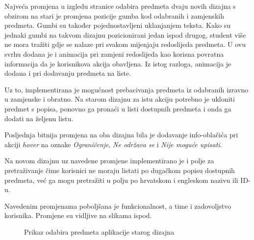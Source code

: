 \documentclass[times, utf8, zavrsni, numeric]{fer}
\begin{document}
    
    Najveća promjena u izgledu stranice odabira predmeta dvaju novih dizajna s obzirom na stari je promjena pozicije gumba kod odabranih i zamjenskih predmeta. Gumbi su također pojednostavljeni uklanjanjem teksta. Kako su jednaki gumbi na takvom dizajnu pozicionirani jedan ispod drugog, student više ne mora tražiti gdje se nalaze pri svakom mijenjaju redoslijeda predmeta. U ovu svrhu dodana je i animacija pri zamjeni redoslijeda kao korisna povratna informacija da je korisnikova akcija obavljena. Iz istog razloga, animacija je dodana i pri dodavanju predmeta na liste.
    
    Uz to, implementirana je mogućnost prebacivanja predmeta iz odabranih izravno u zamjenske i obratno. Na starom dizajnu za istu akciju potrebno je ukloniti predmet s popisa, ponovno ga pronaći u listi dostupnih predmeta i onda ga dodati na željenu listu.
    
    Posljednja bitnija promjena na oba dizajna bila je dodavanje info-oblačića pri akciji \textit{hover} na oznake \textit{Ograničenje}, \textit{Ne održava se} i \textit{Nije moguće upisati}.
    
    Na novom dizajnu uz navedene promjene implementirano je i polje za pretraživanje čime korisnici ne moraju listati po dugačkom popisu dostupnih predmeta, već ga mogu pretražiti u polju po hrvatskom i engleskom nazivu ili ID-u.
    
    Navedenim promjenama poboljšana je funkcionalnost, a time i zadovoljstvo korisnika. Promjene su vidljive na slikama ispod.
    
    \begin{figure} [H]
      \centering
      \caption{Prikaz odabira predmeta aplikacije starog dizajna}
    \end{figure}
    
\end{document}
